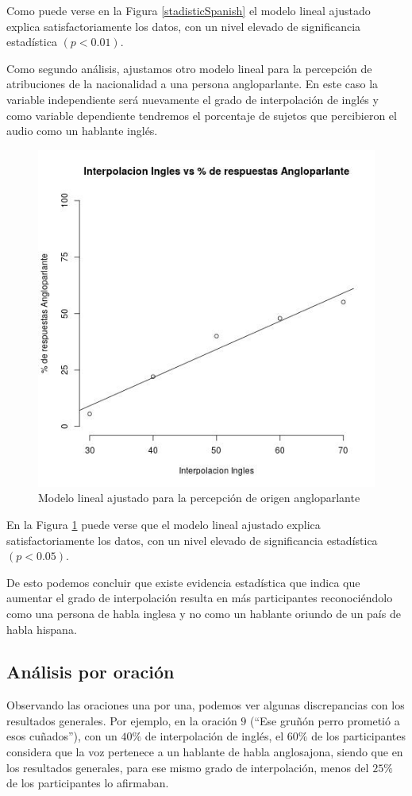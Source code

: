 Como puede verse en la Figura \ref{stadisticSpanish} el modelo lineal ajustado explica satisfactoriamente los datos, con un nivel elevado de significancia estadística $(p<0.01)$.

Como segundo análisis, ajustamos otro modelo lineal para la percepción de atribuciones de la nacionalidad a una persona angloparlante. En este caso la variable independiente será nuevamente el grado de interpolación de inglés y como variable dependiente tendremos el porcentaje de sujetos que percibieron el audio como un hablante inglés.

\begin{figure}
\begin{center}
\includegraphics[trim={0 0 0 1.5cm},clip,width=.5\textwidth]{imagenes/estadistica/english.jpg}
\end{center}
\caption{Modelo lineal ajustado para la percepción de origen angloparlante}
\label{stadisticEnglish}
\end{figure}

En la Figura \ref{stadisticEnglish} puede verse que el modelo lineal ajustado explica satisfactoriamente los datos, con un nivel elevado de significancia estadística $(p<0.05)$.

De esto podemos concluir que existe evidencia estadística que indica que aumentar el grado de interpolación resulta en más participantes reconociéndolo como una persona de habla inglesa y no como un hablante oriundo de un país de habla hispana.

\subsection{Análisis por oración}

Observando las oraciones una por una, podemos ver algunas discrepancias con los resultados generales. Por ejemplo, en la oración $9$ (``Ese gruñón perro prometió a esos cuñados''), con un $40\%$ de interpolación de inglés, el $60\%$ de los participantes considera que la voz pertenece a un hablante de habla anglosajona, siendo que en los resultados generales, para ese mismo grado de interpolación, menos del $25\%$ de los participantes lo afirmaban.

